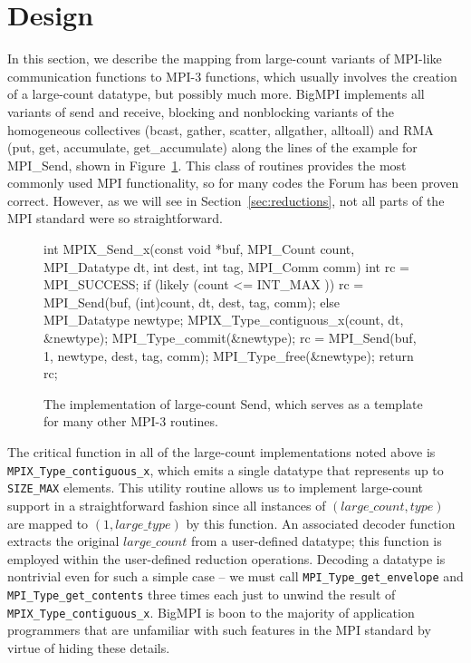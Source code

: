 
\section{Design}

In this section, we describe the mapping from large-count variants
of MPI-like communication functions to MPI-3 functions, which usually
involves the creation of a large-count datatype, but possibly much more.
BigMPI implements all variants of send and receive, blocking and nonblocking variants of
the homogeneous collectives (bcast, gather, scatter, allgather, alltoall)
and RMA (put, get, accumulate, get\_accumulate)
along the lines of the example for MPI\_Send, shown in Figure~\ref{code:mpi_send_x}.
This class of routines provides the most commonly used MPI functionality, 
so for many codes the Forum has been proven correct.  
However, as we will see in Section~\ref{sec:reductions},
not all parts of the MPI standard were so straightforward.

\begin{figure}
\begin{code}
int MPIX_Send_x(const void *buf, MPI_Count count,
                MPI_Datatype dt, int dest,
                int tag, MPI_Comm comm)
{
    int rc = MPI_SUCCESS;
    if (likely (count <= INT_MAX )) {
        rc = MPI_Send(buf, (int)count, dt, dest, tag, comm);
    } else {
        MPI_Datatype newtype;
        MPIX_Type_contiguous_x(count, dt, &newtype);
        MPI_Type_commit(&newtype);
        rc = MPI_Send(buf, 1, newtype, dest, tag, comm);
        MPI_Type_free(&newtype);
    }
    return rc;
}
\end{code}
\caption{The implementation of large-count Send, which serves as a template
for many other MPI-3 routines.\label{code:mpi_send_x}}
\end{figure}

The critical function in all of the large-count implementations noted above
is \texttt{MPIX\_Type\_contiguous\_x}, which emits a single datatype that
represents up to \texttt{SIZE\_MAX} elements.
This utility routine allows us to implement large-count support in a straightforward
fashion since all instances of $(large\_count,type)$ are mapped to $(1,large\_type)$
by this function.
An associated decoder function extracts the original $large\_count$ from a
user-defined datatype; this function is employed within the user-defined reduction
operations.  Decoding a datatype is nontrivial even for such a simple case --
we must call \texttt{MPI\_Type\_get\_envelope} and \texttt{MPI\_Type\_get\_contents}
three times each just to unwind the result of \texttt{MPIX\_Type\_contiguous\_x}.
BigMPI is boon to the majority of application programmers that are unfamiliar 
with such features in the MPI standard by virtue of hiding these details.

